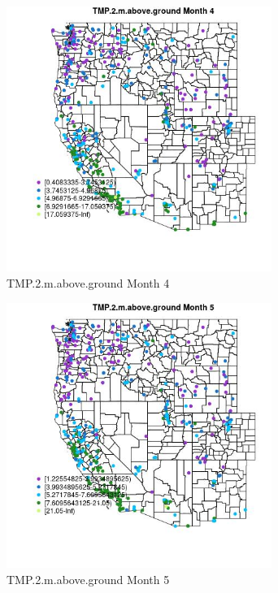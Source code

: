\begin{figure} 
\centering  
\includegraphics[width=0.77\textwidth]{Code_Outputs/ML_input_report_ML_input_PM25_Step5_part_d_de_duplicated_aves_ML_input_MapObsMo4TMP2maboveground.jpg} 
\caption{\label{fig:ML_input_report_ML_input_PM25_Step5_part_d_de_duplicated_aves_ML_inputMapObsMo4TMP2maboveground}TMP.2.m.above.ground Month 4} 
\end{figure} 
 

\begin{figure} 
\centering  
\includegraphics[width=0.77\textwidth]{Code_Outputs/ML_input_report_ML_input_PM25_Step5_part_d_de_duplicated_aves_ML_input_MapObsMo5TMP2maboveground.jpg} 
\caption{\label{fig:ML_input_report_ML_input_PM25_Step5_part_d_de_duplicated_aves_ML_inputMapObsMo5TMP2maboveground}TMP.2.m.above.ground Month 5} 
\end{figure} 
 

